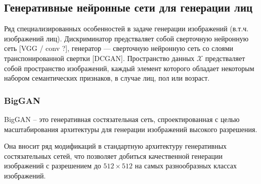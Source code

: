 
\subsection{Генеративные нейронные сети для генерации лиц}


Ряд специализированных особенностей в задаче генерации изображений (в.т.ч. изображений лиц).
Дискриминатор предстваляет собой сверточную нейронную сеть [VGG / conv ?], генератор --- сверточную нейронную сеть со слоями транспонированной свертки [DCGAN].
Пространство данных $\mathcal X$ предстваляет собой пространство изображений, каждый элемент которого обладает некоторым набором семантических признаков, в случае лиц, пол или возраст.


\subsubsection{BigGAN}
BigGAN \cite{bigGAN} – это генеративная состязательная сеть, спроектированная с целью масштабирования архитектуры для генерации изображений высокого разрешения.

Она вносит ряд модификаций в стандартную архитектуру генеративных состязательных сетей, что позволяет добиться качественной генерации изображений с разрешением до $512\times512$ на самых разнообразных классах изображений.


